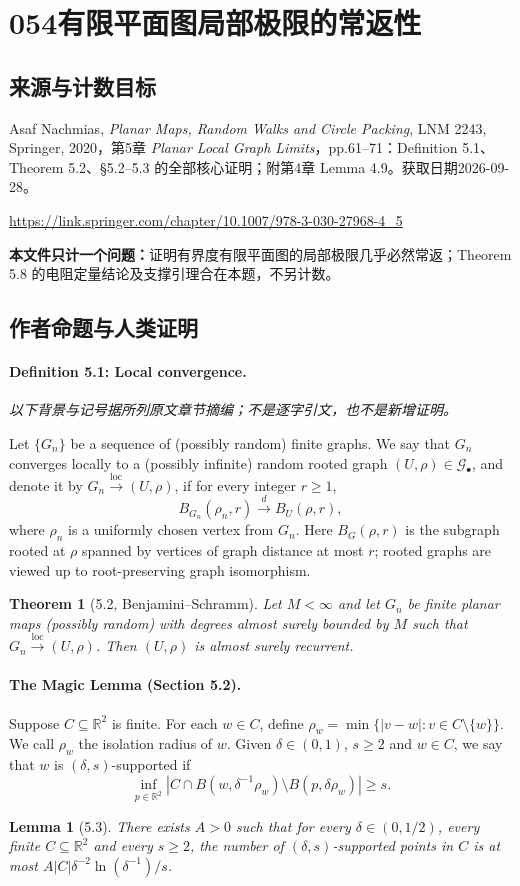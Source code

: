 \documentclass[UTF8,11pt]{ctexart}
\newtheorem*{theorem}{Theorem}
\newtheorem*{lemma}{Lemma}
\theoremstyle{definition}
\newcommand{\R}{\mathbb R}
\begin{document}
\section*{054\quad 有限平面图局部极限的常返性}
\subsection*{来源与计数目标}
Asaf Nachmias, \emph{Planar Maps, Random Walks and Circle Packing}, LNM 2243, Springer, 2020，第5章 \emph{Planar Local Graph Limits}，pp.61--71：Definition 5.1、Theorem 5.2、\S5.2--5.3 的全部核心证明；附第4章 Lemma 4.9。获取日期2026-09-28。
\par\url{https://link.springer.com/chapter/10.1007/978-3-030-27968-4_5}
\par\textbf{本文件只计一个问题：}证明有界度有限平面图的局部极限几乎必然常返；Theorem 5.8 的电阻定量结论及支撑引理合在本题，不另计数。
\subsection*{作者命题与人类证明}
\paragraph{Definition 5.1: Local convergence.}
\noindent\textit{以下背景与记号据所列原文章节摘编；不是逐字引文，也不是新增证明。}\par
Let $\{G_n\}$ be a sequence of (possibly random) finite graphs. We say that $G_n$ converges locally to a (possibly infinite) random rooted graph $(U,\rho)\in\mathcal G_\bullet$, and denote it by $G_n\xrightarrow{\mathrm{loc}}(U,\rho)$, if for every integer $r\ge1$,
\[
B_{G_n}(\rho_n,r)\xrightarrow{d}B_U(\rho,r),
\]
where $\rho_n$ is a uniformly chosen vertex from $G_n$. Here $B_G(\rho,r)$ is the subgraph rooted at $\rho$ spanned by vertices of graph distance at most $r$; rooted graphs are viewed up to root-preserving graph isomorphism.

\begin{theorem}[5.2, Benjamini--Schramm]
Let $M<\infty$ and let $G_n$ be finite planar maps (possibly random) with degrees almost surely bounded by $M$ such that $G_n\xrightarrow{\mathrm{loc}}(U,\rho)$. Then $(U,\rho)$ is almost surely recurrent.
\end{theorem}

\paragraph{The Magic Lemma (Section 5.2).}
Suppose $C\subseteq\R^2$ is finite. For each $w\in C$, define $\rho_w=\min\{|v-w|:v\in C\setminus\{w\}\}$. We call $\rho_w$ the isolation radius of $w$. Given $\delta\in(0,1)$, $s\ge2$ and $w\in C$, we say that $w$ is $(\delta,s)$-supported if
\[
\inf_{p\in\R^2}\left|C\cap B(w,\delta^{-1}\rho_w)\setminus B(p,\delta\rho_w)\right|\ge s.
\]
\begin{lemma}[5.3]
There exists $A>0$ such that for every $\delta\in(0,1/2)$, every finite $C\subseteq\R^2$ and every $s\ge2$, the number of $(\delta,s)$-supported points in $C$ is at most $A|C|\delta^{-2}\ln(\delta^{-1})/s$.
\end{lemma}
\end{document}
